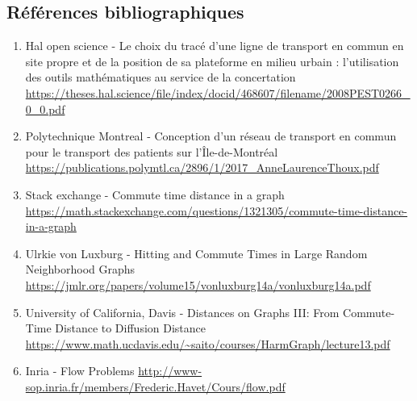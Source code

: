 \documentclass[a4paper,11pt]{article}
\begin{document}
\subsection{Références bibliographiques}
\begin{enumerate}
  \item Hal open science - Le choix du tracé d’une ligne de transport en commun
  en site propre et de la position de sa plateforme en
  milieu urbain : l’utilisation des outils mathématiques au
  service de la concertation \url{https://theses.hal.science/file/index/docid/468607/filename/2008PEST0266_0_0.pdf}
  \item Polytechnique Montreal - Conception d'un réseau de transport en commun pour le transport
  des patients sur l'Île-de-Montréal \url{https://publications.polymtl.ca/2896/1/2017_AnneLaurenceThoux.pdf}
  \item Stack exchange - Commute time distance in a graph \url{https://math.stackexchange.com/questions/1321305/commute-time-distance-in-a-graph}
  \item Ulrkie von Luxburg - Hitting and Commute Times in Large Random
  Neighborhood Graphs \url{https://jmlr.org/papers/volume15/vonluxburg14a/vonluxburg14a.pdf}
  \item University of California, Davis - Distances on Graphs III: From
  Commute-Time Distance to Diffusion Distance \url{https://www.math.ucdavis.edu/~saito/courses/HarmGraph/lecture13.pdf}
  \item Inria - Flow Problems \url{http://www-sop.inria.fr/members/Frederic.Havet/Cours/flow.pdf}
\end{enumerate}
\end{document}

